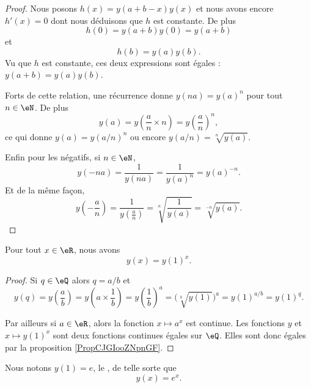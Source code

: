 \begin{proof}
    Nous posons \( h(x)=y(a+b-x)y(x)\) et nous avons encore \( h'(x)=0\) dont nous déduisons que $h$ est constante. De plus
    \begin{equation}
        h(0)=y(a+b)y(0)=y(a+b)
    \end{equation}
    et
    \begin{equation}
        h(b)=y(a)y(b).
    \end{equation}
    Vu que \( h\) est constante, ces deux expressions sont égales : \( y(a+b)=y(a)y(b)\).

    Forts de cette relation, une récurrence donne \( y(na)=y(a)^n\) pour tout \( n\in \eN\). De plus
    \begin{equation}
        y(a)=y\left( \frac{ a }{ n }\times n \right)=y\left( \frac{ a }{ n } \right)^n,
    \end{equation}
    ce qui donne \( y(a)=y(a/n)^n\) ou encore \( y(a/n)=\sqrt[n]{y(a)}\).

    Enfin pour les négatifs, si \( n\in \eN\),
    \begin{equation}
        y(-na)=\frac{1}{ y(na) }=\frac{1}{ y(a)^n }=y(a)^{-n}.
    \end{equation}
    Et de la même façon,
    \begin{equation}
        y\left( -\frac{ a }{ n } \right)=\frac{1}{ y\left( \frac{ a }{ n } \right) }=\sqrt[n]{\frac{1}{ y(a) }}=\sqrt[-n]{y(a)}.
    \end{equation}
\end{proof}

\begin{proposition} \label{PropCELWooLBSYmS}
    Pour tout \( x\in \eR\), nous avons
    \begin{equation}
        y(x)=y(1)^x.
    \end{equation}
\end{proposition}

\begin{proof}
    Si \( q\in \eQ\) alors \( q=a/b\) et
    \begin{equation}
        y(q)=y\left( \frac{ a }{ b } \right)=y\left( a\times \frac{1}{ b } \right)=y\left( \frac{1}{ b } \right)^a=\big( \sqrt[b]{y(1)} \big)^a=y(1)^{a/b}=y(1)^{q}.
    \end{equation}

    Par ailleurs si \( a\in \eR\), alors la fonction \( x\mapsto a^x\) est continue. Les fonctions \( y\) et \( x\mapsto y(1)^x\) sont deux fonctions continues égales sur \( \eQ\). Elles sont donc égales par la proposition \ref{PropCJGIooZNpnGF}.
\end{proof}
Nous notons \( y(1)=e\), le , de telle sorte que
\begin{equation}
    y(x)=e^x.
\end{equation}

